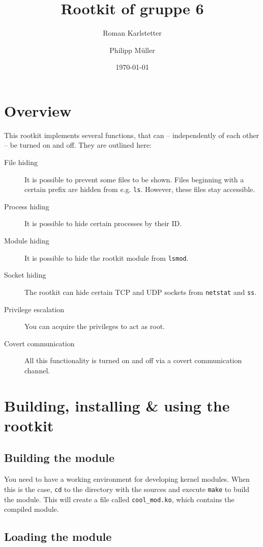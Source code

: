\documentclass[10pt, letterpaper]{article}
\title{Rootkit of gruppe 6}
\author{Roman Karlstetter \and Philipp M\"uller}
\date{\today}
\begin{document}
\maketitle

\section{Overview}

This rootkit implements several functions, that can -- independently of each other -- be turned on and off. They are outlined here:

\begin{description}
\item [File hiding] It is possible to prevent some files to be shown. Files beginning with a certain prefix are hidden from e.g. \texttt{ls}. However, these files stay accessible.
\item [Process hiding] It is possible to hide certain processes by their ID.
\item [Module hiding] It is possible to hide the rootkit module from \texttt{lsmod}.
\item [Socket hiding] The rootkit can hide certain TCP and UDP sockets from \texttt{netstat} and \texttt{ss}.
\item [Privilege escalation] You can acquire the privileges to act as root.
\item [Covert communication] All this functionality is turned on and off via a covert communication channel.
\end{description}

\section{Building, installing \& using the rootkit}

\subsection{Building the module}

You need to have a working environment for developing kernel modules. When this is the case, \texttt{cd} to the directory with the sources and execute \texttt{make} to build the module. This will create a file called \texttt{cool\_mod.ko}, which contains the compiled module.

\subsection{Loading the module}
\end{document}
